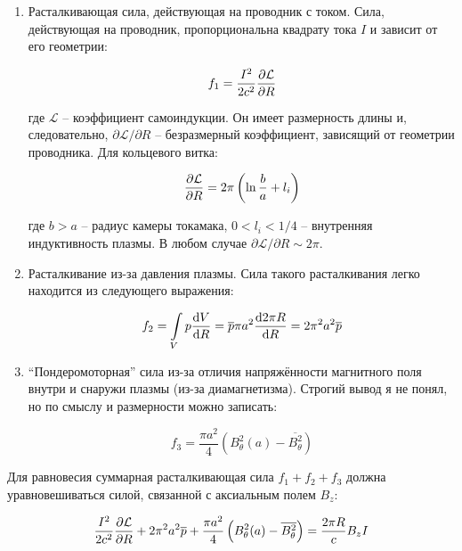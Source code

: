 \documentclass[10pt, a4paper]{article}
\begin{document}
\begin{enumerate}
	
   \item Расталкивающая сила, действующая на проводник с током. Сила, действующая на проводник, пропорциональна квадрату тока $I$ и зависит от его геометрии:
   
   \begin{equation*}
      f_1 = \frac{I^2}{2c^2} \pdv{\mathcal{L}}{R}
   \end{equation*}

   где $\mathcal{L}$ -- коэффициент самоиндукции. Он имеет размерность длины и, следовательно, $\partial\mathcal{L}/\partial R$ -- безразмерный коэффициент, зависящий от геометрии проводника. Для кольцевого витка:
   
   \begin{equation*}
      \pdv{\mathcal{L}}{R} = 2\pi \left( \ln\frac{b}{a} + l_i \right)
   \end{equation*}

   где $b>a$ -- радиус камеры токамака, $0<l_i<1/4$ -- внутренняя индуктивность плазмы. В любом случае $\partial\mathcal{L}/\partial R\sim 2\pi$.

   \item Расталкивание из-за давления плазмы. Сила такого расталкивания легко находится из следующего выражения:
   
   \begin{equation*}
      f_2 = \int\limits_{V} p \dv{V}{R} = \overline{p} \pi a^2 \dv{2\pi R}{R} = 2\pi^2 a^2 \overline{p}
   \end{equation*}

   \item ``Пондеромоторная'' сила из-за отличия напряжённости магнитного поля внутри и снаружи плазмы (из-за диамагнетизма). Строгий вывод я не понял, но по смыслу и размерности можно записать:
   
   \begin{equation*}
      f_3 = \frac{\pi a^2}{4}\left( B_\theta^2(a) - \overline{B_\theta^2} \right)
   \end{equation*}

\end{enumerate}

Для равновесия суммарная расталкивающая сила $f_1+f_2+f_3$ должна уравновешиваться силой, связанной с аксиальным полем $B_z$:

\begin{equation*}
   \frac{I^2}{2c^2} \pdv{\mathcal{L}}{R} + 2\pi^2 a^2 \overline{p} + \frac{\pi a^2}{4}\left( B_\theta^2(a) - \overline{B_\theta^2} \right) = \frac{2\pi R}{c} B_z I
\end{equation*}
\end{document}
